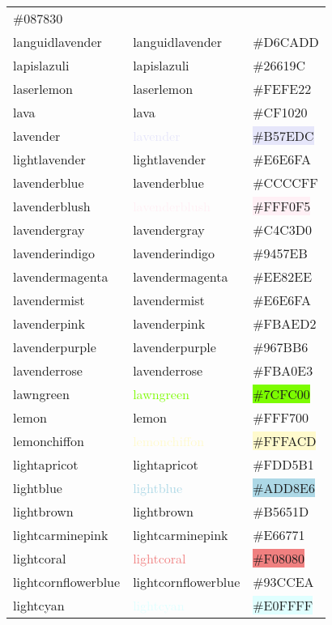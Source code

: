 \documentclass[
]{article}
\begin{document}
\begin{longtable}[]{@{}lll@{}}
\colorbox{lasallegreen}{\#087830}\tabularnewline
languidlavender & \textcolor{languidlavender}{languidlavender} &
\colorbox{languidlavender}{\#D6CADD}\tabularnewline
lapislazuli & \textcolor{lapislazuli}{lapislazuli} &
\colorbox{lapislazuli}{\#26619C}\tabularnewline
laserlemon & \textcolor{laserlemon}{laserlemon} &
\colorbox{laserlemon}{\#FEFE22}\tabularnewline
lava & \textcolor{lava}{lava} & \colorbox{lava}{\#CF1020}\tabularnewline
lavender & \textcolor{lavender}{lavender} &
\colorbox{lavender}{\#B57EDC}\tabularnewline
lightlavender & \textcolor{lightlavender}{lightlavender} &
\colorbox{lightlavender}{\#E6E6FA}\tabularnewline
lavenderblue & \textcolor{lavenderblue}{lavenderblue} &
\colorbox{lavenderblue}{\#CCCCFF}\tabularnewline
lavenderblush & \textcolor{lavenderblush}{lavenderblush} &
\colorbox{lavenderblush}{\#FFF0F5}\tabularnewline
lavendergray & \textcolor{lavendergray}{lavendergray} &
\colorbox{lavendergray}{\#C4C3D0}\tabularnewline
lavenderindigo & \textcolor{lavenderindigo}{lavenderindigo} &
\colorbox{lavenderindigo}{\#9457EB}\tabularnewline
lavendermagenta & \textcolor{lavendermagenta}{lavendermagenta} &
\colorbox{lavendermagenta}{\#EE82EE}\tabularnewline
lavendermist & \textcolor{lavendermist}{lavendermist} &
\colorbox{lightlavender}{\#E6E6FA}\tabularnewline
lavenderpink & \textcolor{lavenderpink}{lavenderpink} &
\colorbox{lavenderpink}{\#FBAED2}\tabularnewline
lavenderpurple & \textcolor{lavenderpurple}{lavenderpurple} &
\colorbox{lavenderpurple}{\#967BB6}\tabularnewline
lavenderrose & \textcolor{lavenderrose}{lavenderrose} &
\colorbox{lavenderrose}{\#FBA0E3}\tabularnewline
lawngreen & \textcolor{lawngreen}{lawngreen} &
\colorbox{lawngreen}{\#7CFC00}\tabularnewline
lemon & \textcolor{lemon}{lemon} &
\colorbox{lemon}{\#FFF700}\tabularnewline
lemonchiffon & \textcolor{lemonchiffon}{lemonchiffon} &
\colorbox{lemonchiffon}{\#FFFACD}\tabularnewline
lightapricot & \textcolor{lightapricot}{lightapricot} &
\colorbox{lightapricot}{\#FDD5B1}\tabularnewline
lightblue & \textcolor{lightblue}{lightblue} &
\colorbox{lightblue}{\#ADD8E6}\tabularnewline
lightbrown & \textcolor{lightbrown}{lightbrown} &
\colorbox{lightbrown}{\#B5651D}\tabularnewline
lightcarminepink & \textcolor{lightcarminepink}{lightcarminepink} &
\colorbox{lightcarminepink}{\#E66771}\tabularnewline
lightcoral & \textcolor{lightcoral}{lightcoral} &
\colorbox{lightcoral}{\#F08080}\tabularnewline
lightcornflowerblue &
\textcolor{lightcornflowerblue}{lightcornflowerblue} &
\colorbox{lightcornflowerblue}{\#93CCEA}\tabularnewline
lightcyan & \textcolor{lightcyan}{lightcyan} &
\colorbox{lightcyan}{\#E0FFFF}\tabularnewline

\end{longtable}
\end{document}
